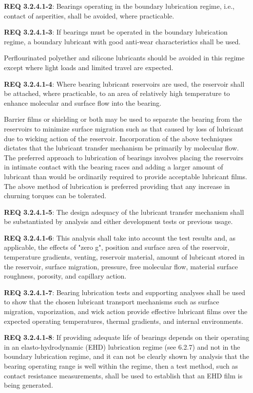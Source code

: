 \documentclass[12pt]{article}
\begin{document}
\noindent \textbf{REQ 3.2.4.1-2}: Bearings operating in the boundary lubrication regime, i.e., contact of asperities, shall be avoided, where practicable. 

\noindent \textbf{REQ 3.2.4.1-3}: If bearings must be operated in the boundary lubrication regime, a boundary lubricant with good anti-wear characteristics shall be used. 

Perflourinated polyether and silicone lubricants should be avoided in this regime except where light loads and limited travel are expected. 

\noindent \textbf{REQ 3.2.4.1-4}: Where bearing lubricant reservoirs are used, the reservoir shall be attached, where practicable, to an area of relatively high temperature to enhance molecular and surface flow into the bearing. 

Barrier films or shielding or both may be used to separate the bearing from the reservoirs to minimize surface migration such as that caused by loss of lubricant due to wicking action of the reservoir. 
Incorporation of the above techniques dictates that the lubricant transfer mechanism be primarily by molecular flow. 
The preferred approach to lubrication of bearings involves placing the reservoirs in intimate contact with the bearing races and adding a larger amount of lubricant than would be ordinarily required to provide acceptable lubricant films. 
The above method of lubrication is preferred providing that any increase in churning torques can be tolerated. 

\noindent \textbf{REQ 3.2.4.1-5}: The design adequacy of the lubricant transfer mechanism shall be substantiated by analysis and either development tests or previous usage. 

\noindent \textbf{REQ 3.2.4.1-6}: This analysis shall take into account the test results and, as applicable, the effects of "zero g", position and surface area of the reservoir, temperature gradients, venting, reservoir material, amount of lubricant stored in the reservoir, surface migration, pressure, free molecular flow, material surface roughness, porosity, and capillary action. 

\noindent \textbf{REQ 3.2.4.1-7}: Bearing lubrication tests and supporting analyses shall be used to show that the chosen lubricant transport mechanisms such as surface migration, vaporization, and wick action provide effective lubricant films over the expected operating temperatures, thermal gradients, and internal environments. 

\noindent \textbf{REQ 3.2.4.1-8}: If providing adequate life of bearings depends on their operating in an elasto-hydrodynamic (EHD) lubrication regime (see 6.2.7) and not in the boundary lubrication regime, and it can not be clearly shown by analysis that the bearing operating range is well within the regime, then a test method, such as contact resistance measurements, shall be used to establish that an EHD film is being generated. 
\end{document}
